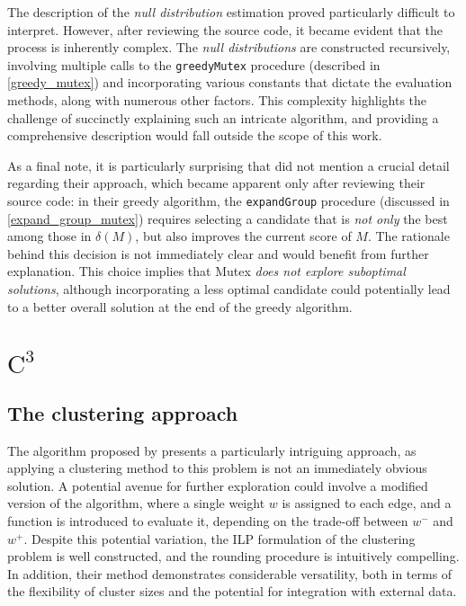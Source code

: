 The description of the \textit{null distribution} estimation proved particularly difficult to interpret. However, after reviewing the source code, it became evident that the process is inherently complex. The \textit{null distributions} are constructed recursively, involving multiple calls to the \texttt{greedyMutex} procedure (described in \cref{greedy_mutex}) and incorporating various constants that dictate the evaluation methods, along with numerous other factors. This complexity highlights the challenge of succinctly explaining such an intricate algorithm, and providing a comprehensive description would fall outside the scope of this work.

As a final note, it is particularly surprising that \textcite{mutex} did not mention a crucial detail regarding their approach, which became apparent only after reviewing their source code: in their greedy algorithm, the \texttt{expandGroup} procedure (discussed in \cref{expand_group_mutex}) requires selecting a candidate that is \textit{not only} the best among those in $\delta(M)$, but also improves the current score of $M$. The rationale behind this decision is not immediately clear and would benefit from further explanation. This choice implies that Mutex \textit{does not explore suboptimal solutions}, although incorporating a less optimal candidate could potentially lead to a better overall solution at the end of the greedy algorithm.

\section{$\mathrm{C}^3$}

\subsection{The clustering approach}

The algorithm proposed by \textcite{c3} presents a particularly intriguing approach, as applying a clustering method to this problem is not an immediately obvious solution. A potential avenue for further exploration could involve a modified version of the algorithm, where a single weight $w$ is assigned to each edge, and a function is introduced to evaluate it, depending on the trade-off between $w^-$ and $w^+$. Despite this potential variation, the ILP formulation of the clustering problem is well constructed, and the rounding procedure is intuitively compelling. In addition, their method demonstrates considerable versatility, both in terms of the flexibility of cluster sizes and the potential for integration with external data.

\cleardoublepage
